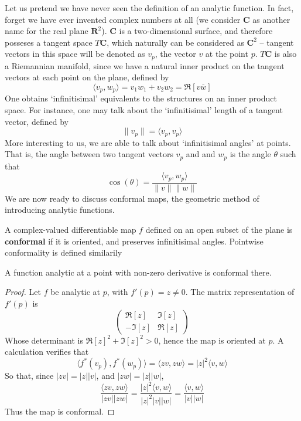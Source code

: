 Let us pretend we have never seen the definition of an analytic function. In fact, forget we have ever invented complex numbers at all (we consider $\mathbf{C}$ as another name for the real plane $\mathbf{R}^2$). $\mathbf{C}$ is a two-dimensional surface, and therefore posseses a tangent space $T\mathbf{C}$, which naturally can be considered as $\mathbf{C}^2$ -- tangent vectors in this space will be denoted as $v_p$, the vector $v$ at the point $p$. $T\mathbf{C}$ is also a Riemannian manifold, since we have a natural inner product on the tangent vectors at each point on the plane, defined by
%
\[ \langle v_p, w_p \rangle = v_1 w_1 + v_2 w_2 = \Re[v\overline{w}] \]
%
One obtains `infinitisimal' equivalents to the structures on an inner product space. For instance, one may talk about the `infinitisimal' length of a tangent vector, defined by
%
\[ \| v_p \| = \langle v_p, v_p \rangle \]
%
More interesting to us, we are able to talk about `infinitisimal angles' at points. That is, the angle between two tangent vectors $v_p$ and and $w_p$ is the angle $\theta$ such that
%
\[ \cos(\theta) = \frac{\langle v_p, w_p \rangle}{\|v\| \|w\|} \]
%
We are now ready to discuss conformal maps, the geometric method of introducing analytic functions.

\begin{definition}
    A complex-valued differentiable map $f$ defined on an open subset of the plane is {\bf conformal} if it is oriented, and preserves infinitisimal angles. Pointwise conformality is defined similarily
\end{definition}

\begin{lemma}
    A function analytic at a point with non-zero derivative is conformal there.
\end{lemma}
\begin{proof}
    Let $f$ be analytic at $p$, with $f'(p) = z \neq 0$. The matrix representation of $f'(p)$ is
    \[ \begin{pmatrix} \Re[z] & \Im[z] \\ -\Im[z] & \Re[z] \end{pmatrix} \]
    Whose determinant is $\Re[z]^2 + \Im[z]^2 > 0$, hence the map is oriented at $p$. A calculation verifies that
    \[ \langle f^*(v_p), f^*(w_p) \rangle = \langle zv, zw \rangle = |z|^2 \langle v, w \rangle  \]
    So that, since $|zv| = |z||v|$, and $|zw| = |z||w|$,
    \[ \frac{\langle zv, zw \rangle}{|zv||zw|} = \frac{|z|^2 \langle v, w \rangle }{|z|^2|v||w|} = \frac{\langle v, w \rangle}{|v||w|} \]
    Thus the map is conformal.
\end{proof}

